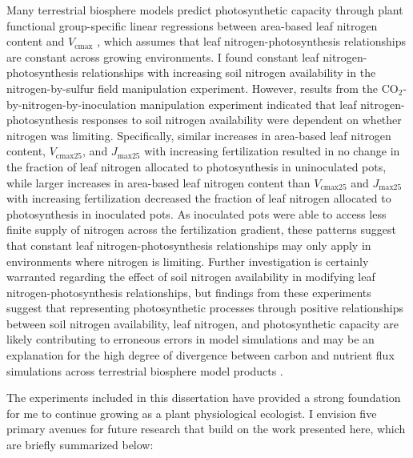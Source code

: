 Many terrestrial biosphere models predict photosynthetic capacity through plant functional group-specific linear regressions between area-based leaf nitrogen content and $V_\mathrm{cmax}$ , which assumes that leaf nitrogen-photosynthesis relationships are constant across growing environments. I found constant leaf nitrogen-photosynthesis relationships with increasing soil nitrogen availability in the nitrogen-by-sulfur field manipulation experiment. However, results from the CO$_2$-by-nitrogen-by-inoculation manipulation experiment indicated that leaf nitrogen-photosynthesis responses to soil nitrogen availability were dependent on whether nitrogen was limiting. Specifically, similar increases in area-based leaf nitrogen content, $V_\mathrm{cmax25}$, and $J_\mathrm{max25}$ with increasing fertilization resulted in no change in the fraction of leaf nitrogen allocated to photosynthesis in uninoculated pots, while larger increases in area-based leaf nitrogen content than $V_\mathrm{cmax25}$ and $J_\mathrm{max25}$ with increasing fertilization decreased the fraction of leaf nitrogen allocated to photosynthesis in inoculated pots. As inoculated pots were able to access less finite supply of nitrogen across the fertilization gradient, these patterns suggest that constant leaf nitrogen-photosynthesis relationships may only apply in environments where nitrogen is limiting. Further investigation is certainly warranted regarding the effect of soil nitrogen availability in modifying leaf nitrogen-photosynthesis relationships, but findings from these experiments suggest that representing photosynthetic processes through positive relationships between soil nitrogen availability, leaf nitrogen, and photosynthetic capacity are likely contributing to erroneous errors in model simulations and may be an explanation for the high degree of divergence between carbon and nutrient flux simulations across terrestrial biosphere model products .

The experiments included in this dissertation have provided a strong foundation for me to continue growing as a plant physiological ecologist. I envision five primary avenues for future research that build on the work presented here, which are briefly summarized below:


